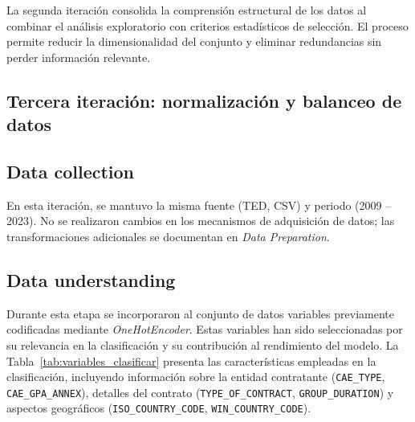 \documentclass[a4paper,fleqn]{cas-sc}
\begin{document}
	La segunda iteración consolida la comprensión estructural de los datos al combinar el análisis exploratorio con criterios estadísticos de selección. 
El proceso permite reducir la dimensionalidad del conjunto y eliminar redundancias sin perder información relevante. 



\subsection{Tercera iteración: normalización y balanceo de datos}


\subsection*{Data collection}

	En esta iteración, se mantuvo la misma fuente (TED, CSV) y periodo (2009 -- 2023). No se realizaron cambios en los mecanismos de adquisición de datos; las transformaciones adicionales se documentan en \textit{Data Preparation}.

\subsection*{Data understanding}

	Durante esta etapa se incorporaron al conjunto de datos variables previamente codificadas mediante \textit{OneHotEncoder}. Estas variables han sido seleccionadas por su relevancia en la clasificación y su contribución al rendimiento del modelo. 
	La Tabla~\ref{tab:variables_clasificar} presenta las características empleadas en la clasificación, incluyendo información sobre la entidad contratante (\texttt{CAE\_TYPE}, \texttt{CAE\_GPA\_ANNEX}), detalles del contrato (\texttt{TYPE\_OF\_CONTRACT}, \texttt{GROUP\_DURATION}) y aspectos geográficos (\texttt{ISO\_COUNTRY\_CODE}, \texttt{WIN\_COUNTRY\_CODE}). 
\end{document}
